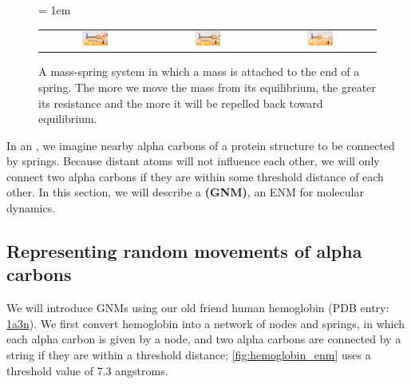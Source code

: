 \begin{figure}[h]
	\centering
	\tabcolsep = 1em
	\mySfFamily
	\begin{tabular}{c c c}
		\includegraphics[width = 0.25\textwidth]{../images/mass_spring1.png} & \includegraphics[width = 0.25\textwidth]{../images/mass_spring2.png} & \includegraphics[width = 0.25\textwidth]{../images/mass_spring3.png}
	\end{tabular}
	\caption{A mass-spring system in which a mass is attached to the end of a spring. The more we move the mass from its equilibrium, the greater its resistance and the more it will be repelled back toward equilibrium.}
	\label{fig:mass-spring}
\end{figure}


In an , we imagine nearby alpha carbons of a protein structure to be connected by springs. Because distant atoms will not influence each other, we will only connect two alpha carbons if they are within some threshold distance of each other. In this section, we will describe a  \textbf{(GNM)}, an ENM for molecular dynamics.


\FloatBarrier
{}
\subsection{Representing random movements of alpha carbons}

We will introduce GNMs using our old friend human hemoglobin (PDB entry: \href{https://www.rcsb.org/structure/1a3n}{1a3n}). We first convert hemoglobin into a network of nodes and springs, in which each alpha carbon is given by a node, and two alpha carbons are connected by a string if they are within a threshold distance; \autoref{fig:hemoglobin_enm} uses a threshold value of 7.3 angstroms.\\

